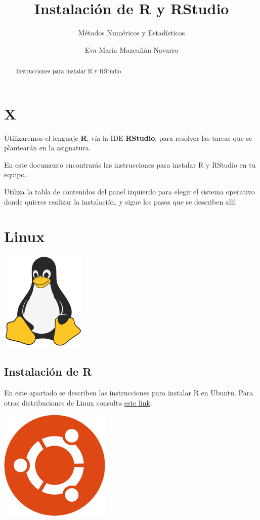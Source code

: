 \documentclass[spanish,]{article}
\title{Instalación de R y RStudio}
\subtitle{Métodos Numéricos y Estadísticos}
\author{Eva María Mazcuñán Navarro}
\date{}
\begin{document}
\maketitle
\begin{abstract}
Instrucciones para instalar R y RStudio
\end{abstract}


{
\setcounter{tocdepth}{2}
\tableofcontents
}
\hypertarget{x}{%
\section*{X}\label{x}}

Utilizaremos el lenguaje \textbf{R}, vía la IDE \textbf{RStudio}, para resolver las tareas que se plantearán en la asignatura.

En este documento encontrarás las instrucciones para instalar R y RStudio en tu equipo.

Utiliza la tabla de contenidos del panel izquierdo para elegir el sistema operativo donde quieres realizar la instalación, y sigue los pasos que se describen allí.

\hypertarget{linux}{%
\section{Linux}\label{linux}}

\begin{center}\includegraphics[width=0.15\linewidth]{images/os/tux-flat} \end{center}

\hypertarget{instalaciuxf3n-de-r}{%
\subsection{Instalación de R}\label{instalaciuxf3n-de-r}}

En este apartado se describen las instrucciones para instalar R en Ubuntu. Para otras distribuciones de Linux consulta \href{https://ftp.cixug.es/CRAN/bin/linux/}{este link}.

\begin{center}\includegraphics[width=0.15\linewidth]{images/os/ubuntu} \end{center}
\end{document}
